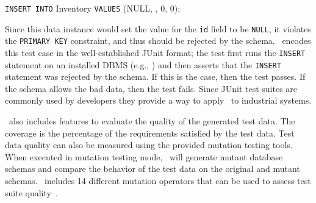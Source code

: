 
\vspace*{.1in}
\texttt{INSERT INTO} Inventory \texttt{VALUES} (NULL, \textquotesingle\textquotesingle, 0, 0);
\vspace*{.1in}


Since this data instance would set the value for the \texttt{id} field to be \texttt{NULL}, it violates the
\texttt{PRIMARY KEY} constraint, and thus should be rejected by the schema. \sa~encodes this test case in the
well-established JUnit format; the test first runs the \texttt{INSERT} statement on an installed DBMS (e.g., \sqlite)
and then asserts that the \texttt{INSERT} statement was rejected by the schema. If this is the case, then the test
passes.  If the schema allows the bad data, then the test fails. Since JUnit test suites are commonly used by
developers they provide a way to apply \sa~to industrial systems.


\sa~also includes features to evaluate the quality of the generated test data. The coverage is the percentage of the
requirements satisfied by the test data.  Test data quality can also be measured using the provided mutation testing
tools. When executed in mutation testing mode, \sa~will generate mutant database schemas and compare the behavior of the
test data on the original and mutant schemas. \sa~includes 14 different mutation operators that can be used to assess
test suite quality~\cite{wright2015mutation}.



